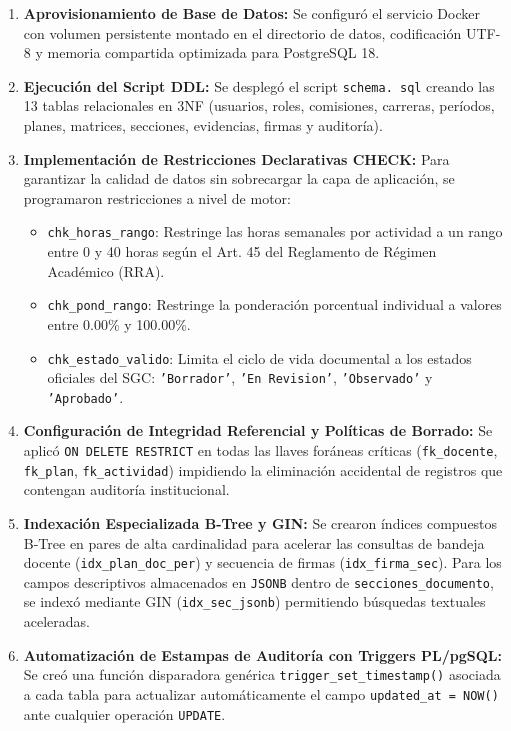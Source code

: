 \documentclass[12pt,a4paper]{article}
\begin{document}
\begin{enumerate}[leftmargin=1.5em, itemsep=3pt]
    \item \textbf{Aprovisionamiento de Base de Datos:} Se configuró el servicio Docker con volumen persistente montado en el directorio de datos, codificación UTF-8 y memoria compartida optimizada para PostgreSQL 18.
    \item \textbf{Ejecución del Script DDL:} Se desplegó el script \texttt{schema. sql} creando las 13 tablas relacionales en 3NF (usuarios, roles, comisiones, carreras, períodos, planes, matrices, secciones, evidencias, firmas y auditoría).
    \item \textbf{Implementación de Restricciones Declarativas CHECK:} Para garantizar la calidad de datos sin sobrecargar la capa de aplicación, se programaron restricciones a nivel de motor:
    \begin{itemize}[leftmargin=1.2em, itemsep=2pt]
        \item \texttt{chk\_\allowbreak  horas\_\allowbreak  rango}: Restringe las horas semanales por actividad a un rango entre 0 y 40 horas según el Art. 45 del Reglamento de Régimen Académico (RRA).
        \item \texttt{chk\_\allowbreak  pond\_\allowbreak  rango}: Restringe la ponderación porcentual individual a valores entre 0.00\% y 100.00\%.
        \item \texttt{chk\_\allowbreak  estado\_\allowbreak  valido}: Limita el ciclo de vida documental a los estados oficiales del SGC: \texttt{'Borrador'}, \texttt{'En Revision'}, \texttt{'Observado'} y \texttt{'Aprobado'}.
    \end{itemize}
    \item \textbf{Configuración de Integridad Referencial y Políticas de Borrado:} Se aplicó \texttt{ON DELETE RESTRICT} en todas las llaves foráneas críticas (\texttt{fk\_\allowbreak  docente}, \texttt{fk\_\allowbreak  plan}, \texttt{fk\_\allowbreak  actividad}) impidiendo la eliminación accidental de registros que contengan auditoría institucional.
    \item \textbf{Indexación Especializada B-Tree y GIN:} Se crearon índices compuestos B-Tree en pares de alta cardinalidad para acelerar las consultas de bandeja docente (\texttt{idx\_\allowbreak  plan\_\allowbreak  doc\_\allowbreak  per}) y secuencia de firmas (\texttt{idx\_\allowbreak  firma\_\allowbreak  sec}). Para los campos descriptivos almacenados en \texttt{JSONB} dentro de \texttt{secciones\_\allowbreak  documento}, se indexó mediante GIN (\texttt{idx\_\allowbreak  sec\_\allowbreak  jsonb}) permitiendo búsquedas textuales aceleradas.
    \item \textbf{Automatización de Estampas de Auditoría con Triggers PL/pgSQL:} Se creó una función disparadora genérica \texttt{trigger\_\allowbreak  set\_\allowbreak  timestamp()} asociada a cada tabla para actualizar automáticamente el campo \texttt{updated\_\allowbreak  at = NOW()} ante cualquier operación \texttt{UPDATE}.
\end{enumerate}
\end{document}
